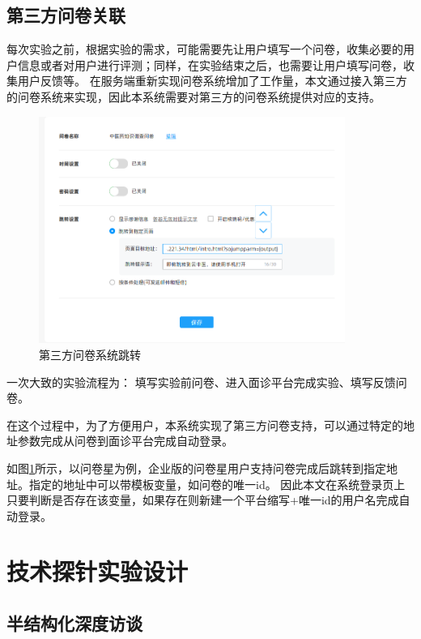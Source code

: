 \subsection{第三方问卷关联}
每次实验之前，根据实验的需求，可能需要先让用户填写一个问卷，收集必要的用户信息或者对用户进行评测；同样，在实验结束之后，也需要让用户填写问卷，收集用户反馈等。
在服务端重新实现问卷系统增加了工作量，本文通过接入第三方的问卷系统来实现，因此本系统需要对第三方的问卷系统提供对应的支持。


\begin{figure}[h]
    \centering
    \includegraphics[width=10cm]{images/wjx1.png}
    \caption{第三方问卷系统跳转}
    \label{fig:wjx-ssojump}
\end{figure}

一次大致的实验流程为： 填写实验前问卷、进入面诊平台完成实验、填写反馈问卷。

在这个过程中，为了方便用户，本系统实现了第三方问卷支持，可以通过特定的地址参数完成从问卷到面诊平台完成自动登录。

如图\ref{fig:wjx-ssojump}所示，以问卷星为例，企业版的问卷星用户支持问卷完成后跳转到指定地址。指定的地址中可以带模板变量，如问卷的唯一id。
因此本文在系统登录页上只要判断是否存在该变量，如果存在则新建一个平台缩写+唯一id的用户名完成自动登录。


\section{技术探针实验设计}

\subsection{半结构化深度访谈}


